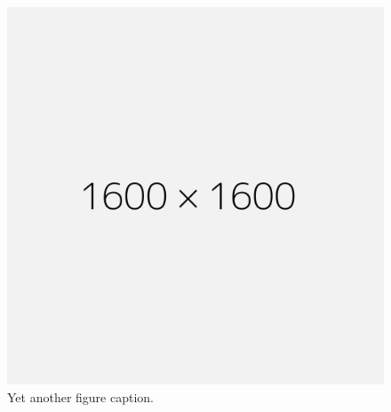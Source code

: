 \documentclass[14 pt]{beamer}
\begin{document}
\begin{frame}[t]
\begin{columns}[t]
  \begin{column}{0.45\textwidth}
    \begin{figure}[t]
      \includegraphics[width=1\textwidth]{img/1600x1600.png}
      \caption{Yet another figure caption.}
    \end{figure}
  \end{column}

\end{columns}

\end{frame}

\end{document}
